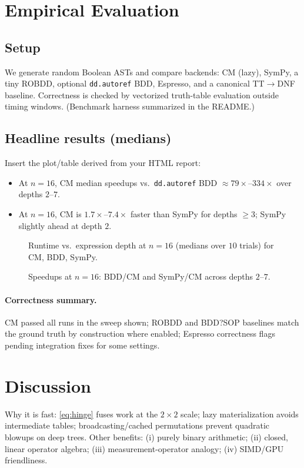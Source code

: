 \documentclass[11pt]{article}
\begin{document}
\section{Empirical Evaluation}
\label{sec:eval}
\subsection{Setup}
We generate random Boolean ASTs and compare backends: CM (lazy), SymPy, a tiny ROBDD, optional \texttt{dd.autoref} BDD, Espresso, and a canonical TT$\to$DNF baseline. Correctness is checked by vectorized truth-table evaluation outside timing windows. (Benchmark harness summarized in the README.)

\subsection{Headline results (medians)}
Insert the plot/table derived from your HTML report:
\begin{itemize}
  \item At $n=16$, CM median speedups vs.\ \texttt{dd.autoref} BDD $\approx 79\times$--$334\times$ over depths $2$--$7$.
  \item At $n=16$, CM is $1.7\times$--$7.4\times$ faster than SymPy for depths $\ge 3$; SymPy slightly ahead at depth $2$.
\end{itemize}

\begin{figure}[t]
  \centering
  \fbox{\rule{0pt}{1.65in}\rule{0.88\linewidth}{0pt}}
  \caption{Runtime vs.\ expression depth at $n=16$ (medians over $10$ trials) for CM, BDD, SymPy.}
  \label{fig:time_vs_depth}
\end{figure}

\begin{figure}[t]
  \centering
  \fbox{\rule{0pt}{1.65in}\rule{0.88\linewidth}{0pt}}
  \caption{Speedups at $n=16$: BDD/CM and SymPy/CM across depths $2$--$7$.}
  \label{fig:speedups}
\end{figure}

\paragraph{Correctness summary.}
CM passed all runs in the sweep shown; ROBDD and BDD?SOP baselines match the ground truth by construction where enabled; Espresso correctness flags pending integration fixes for some settings.

\section{Discussion}
Why it is fast: \eqref{eq:hinge} fuses work at the $2\times2$ scale; lazy materialization avoids intermediate tables; broadcasting/cached permutations prevent quadratic blowups on deep trees. Other benefits: (i) purely binary arithmetic; (ii) closed, linear operator algebra; (iii) measurement-operator analogy; (iv) SIMD/GPU friendliness.
\end{document}
